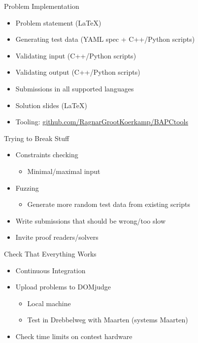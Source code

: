 \documentclass[11pt,pdf, aspectratio=169]{beamer}
\begin{document}
  \begin{frame}{Problem Implementation}
    \begin{itemize}
      \item Problem statement (LaTeX)
      \item Generating test data (YAML spec + C++/Python scripts)
      \item Validating input (C++/Python scripts)
      \item Validating output (C++/Python scripts)
      \item Submissions in all supported languages
      \item Solution slides (LaTeX) \\[1em]
      \item Tooling: \url{github.com/RagnarGrootKoerkamp/BAPCtools}
    \end{itemize}
  \end{frame}
  \begin{frame}{Trying to Break Stuff}
    \begin{itemize}
      \item Constraints checking
        \begin{itemize}
          \item Minimal/maximal input
        \end{itemize}
      \item Fuzzing
        \begin{itemize}
          \item Generate more random test data from existing scripts
        \end{itemize}
      \item Write submissions that should be wrong/too slow
      \item Invite proof readers/solvers
    \end{itemize}
  \end{frame}
  \begin{frame}{Check That Everything Works}
    \begin{itemize}
      \item Continuous Integration
      \item Upload problems to DOMjudge
        \begin{itemize}
          \item Local machine
          \item Test in Drebbelweg with Maarten (systems Maarten)
        \end{itemize}
      \item Check time limits on contest hardware
    \end{itemize}
  \end{frame}
\end{document}
